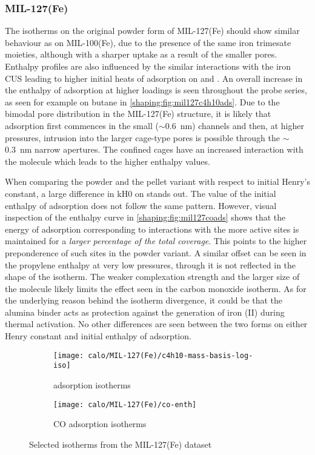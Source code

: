 
\subsubsection{MIL-127(Fe)}

The isotherms on the original powder form of MIL-127(Fe)
should show similar behaviour as on MIL-100(Fe),
due to the presence of the same iron trimesate moieties,
although with a sharper uptake as a result of the smaller pores. Enthalpy
profiles are also influenced by the similar interactions with the iron
\gls{CUS} leading to higher initial heats of adsorption on  and .
An overall increase in the enthalpy of adsorption at higher loadings is seen
throughout the probe series, as seen for example on butane in
\autoref{shaping:fig:mil127c4h10ads}.
Due to the bimodal pore distribution in the MIL-127(Fe) structure,
it is likely that adsorption first commences in the small
(\( \sim \)\SI{0.6}{\nano\metre}) channels and then, at higher pressures,
intrusion into the larger cage-type pores is possible through the
\( \sim \)\SI{0.3}{\nano\metre} narrow apertures.
The confined cages have an increased interaction with the molecule
which leads to the higher enthalpy values.

When comparing the powder and the pellet variant with respect to
initial Henry's constant, a large difference in \gls{kH0} on 
stands out. The value of the initial enthalpy of adsorption
does not follow the same pattern.
However, visual inspection of the enthalpy curve in
\autoref{shaping:fig:mil127coads} shows that the energy of
adsorption corresponding to
interactions with the more active sites is maintained for a \textit{larger
percentage of the total coverage}.
This points to the higher preponderence of such sites in the powder
variant. A similar offset can be seen in the propylene enthalpy at very
low pressures, through it is not reflected in the shape of the isotherm.
The weaker complexation strength and the larger size of the molecule
likely limits the effect seen in the carbon monoxide isotherm.
As for the underlying reason behind the isotherm divergence, it
could be that the alumina binder acts as protection against the
generation of iron (II) during thermal activation.
No other differences are seen between the two forms on either Henry
constant and initial enthalpy of adsorption.

\begin{figure}[!htb]
	\centering
	\begin{subfigure}{0.45\textwidth}
		\texttt{[image: calo/MIL-127(Fe)/c4h10-mass-basis-log-iso]}
		\caption{ adsorption isotherms}%
		\label{shaping:fig:mil127c4h10ads}
	\end{subfigure}%
	\begin{subfigure}{0.45\textwidth}
		\texttt{[image: calo/MIL-127(Fe)/co-enth]}
		\caption{CO adsorption isotherms}%
		\label{shaping:fig:mil127coads}
	\end{subfigure}%
	\caption{Selected isotherms from the MIL-127(Fe) dataset}%
	\label{shaping:fig:mil127isotherms}
\end{figure}

